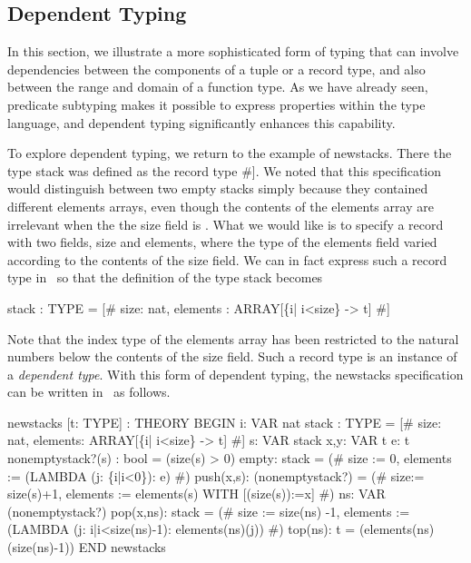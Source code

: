 \subsection{Dependent Typing}
\label{dependent-typing}

In this section, we illustrate a more sophisticated form of typing that
can involve dependencies between the components of a tuple or a record
type, and also between the range and domain of a function type.  As we
have already seen, predicate subtyping makes it possible to express
properties within the type language, and dependent typing significantly
enhances this capability.

To explore dependent typing, we return to the example of {\stt
newstacks}.  There the type {\stt stack} was defined as the record type
{\stt [\# size:\ nat, elements :\ ARRAY[nat -> t] \#]}.  We noted that this
specification would distinguish between two empty stacks simply because
they contained different {\stt elements} arrays, even though the contents
of the {\stt elements} array are irrelevant when the the {\stt size} field
is {}.  What we would like is to specify a record with two fields,
{\stt size} and {\stt elements}, where the type of the {\stt elements}
field varied according to the contents of the {\stt size} field.  We can
in fact express such a record type in \pvs\ so that the definition of
the type {\stt stack} becomes
\begin{pvsex}
  stack : TYPE =
      [\# size: nat, elements : ARRAY[\{i| i<size\} -> t] \#]
\end{pvsex}
%
Note that the index type of the {\stt elements} array has been restricted
to the natural numbers below the contents of the {\stt size} field.  Such
a record type is an instance of a {\em dependent type\/}.  With this
form of dependent typing, the {\stt newstacks} specification can be
written in \pvs\ as follows.
\begin{pvsex}
  newstacks [t: TYPE] : THEORY 
   BEGIN
    i: VAR nat
    stack : TYPE = [\# size: nat, elements: ARRAY[\{i| i<size\} -> t] \#]
    s: VAR stack
    x,y: VAR t
    e: t
    nonemptystack?(s) : bool = (size(s) > 0)
    empty: stack =
      (\# size := 0, elements := (LAMBDA (j: \{i|i<0\}): e) \#)
    push(x,s): (nonemptystack?) =
      (\# size:= size(s)+1,
         elements := elements(s) WITH [(size(s)):=x] \#)
    ns: VAR (nonemptystack?)
    pop(x,ns): stack = 
      (# size := size(ns) -1,
         elements := (LAMBDA (j: {i|i<size(ns)-1}):
                     elements(ns)(j)) #)
    top(ns): t = (elements(ns)(size(ns)-1))
   END newstacks 
\end{pvsex}

